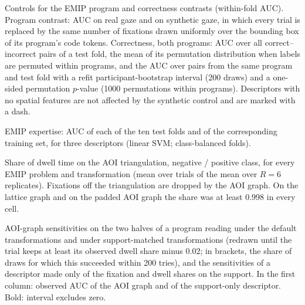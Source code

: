 \documentclass[10pt]{article}
\begin{document}
{\scriptsize\setlength{\LTcapwidth}{\linewidth}

}

\begin{table}[!htbp]\centering\scriptsize
\caption{Controls for the EMIP program and correctness contrasts (within-fold AUC). Program contrast: AUC on real gaze and on synthetic gaze, in which every trial is replaced by the same number of fixations drawn uniformly over the bounding box of its program's code tokens. Correctness, both programs: AUC over all correct--incorrect pairs of a test fold, the mean of its permutation distribution when labels are permuted within programs, and the AUC over pairs from the same program and test fold with a refit participant-bootstrap interval (200 draws) and a one-sided permutation $p$-value (1000 permutations within programs). Descriptors with no spatial features are not affected by the synthetic control and are marked with a dash.}

\end{table}

\begin{table}[!htbp]\centering\scriptsize
\caption{EMIP expertise: AUC of each of the ten test folds and of the corresponding training set, for three descriptors (linear SVM; class-balanced folds).}

\end{table}

\begin{table}[!htbp]\centering\scriptsize
\caption{Share of dwell time on the AOI triangulation, negative / positive class, for every EMIP problem and transformation (mean over trials of the mean over $R = 6$ replicates). Fixations off the triangulation are dropped by the AOI graph. On the lattice graph and on the padded AOI graph the share was at least 0.998 in every cell.}
\resizebox{\linewidth}{!}{}
\end{table}

\begin{table}[!htbp]\centering\scriptsize
\caption{AOI-graph sensitivities on the two halves of a program reading under the default transformations and under support-matched transformations (redrawn until the trial keeps at least its observed dwell share minus 0.02; in brackets, the share of draws for which this succeeded within 200 tries), and the sensitivities of a descriptor made only of the fixation and dwell shares on the support. In the first column: observed AUC of the AOI graph and of the support-only descriptor. Bold: interval excludes zero.}
\resizebox{\linewidth}{!}{}
\end{table}
\end{document}
